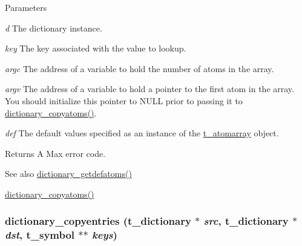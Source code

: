 \begin{DoxyParams}{Parameters}
\item[{\em d}]The dictionary instance. \item[{\em key}]The key associated with the value to lookup. \item[{\em argc}]The address of a variable to hold the number of atoms in the array. \item[{\em argv}]The address of a variable to hold a pointer to the first atom in the array. You should initialize this pointer to NULL prior to passing it to \hyperlink{group__dictionary_ga15aff654a0d97b363e7676ff7e9709fd}{dictionary\_\-copyatoms()}. \item[{\em def}]The default values specified as an instance of the \hyperlink{structt__atomarray}{t\_\-atomarray} object. \end{DoxyParams}
\begin{DoxyReturn}{Returns}
A Max error code.
\end{DoxyReturn}
\begin{DoxySeeAlso}{See also}
\hyperlink{group__dictionary_ga2ab733c5d5fe85e31e73d5a66d75dabd}{dictionary\_\-getdefatoms()} 

\hyperlink{group__dictionary_ga15aff654a0d97b363e7676ff7e9709fd}{dictionary\_\-copyatoms()} 
\end{DoxySeeAlso}
\hypertarget{group__dictionary_ga53ef6b088fed8ef360292a659a383487}{
\subsubsection[{dictionary\_\-copyentries}]{ dictionary\_\-copyentries ({\bf t\_\-dictionary} $\ast$ {\em src}, \/  {\bf t\_\-dictionary} $\ast$ {\em dst}, \/  {\bf t\_\-symbol} $\ast$$\ast$ {\em keys})}}
\label{group__dictionary_ga53ef6b088fed8ef360292a659a383487}


